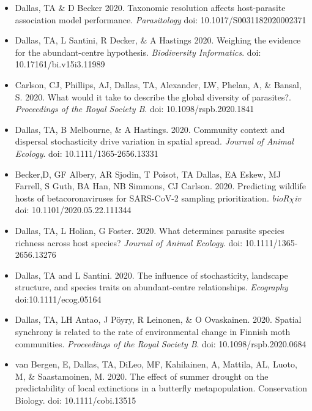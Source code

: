 \documentclass[]{CV}
\begin{document}
\begin{itemize}

\item {\mefont Dallas, TA} \& D Becker 2020. Taxonomic resolution affects host-parasite association model performance. \textit{Parasitology} doi: 10.1017/S0031182020002371

\item {\mefont Dallas, TA}, L Santini, R Decker, \& A Hastings 2020. Weighing the evidence for the abundant-centre hypothesis. \textit{Biodiversity Informatics}. doi: 10.17161/bi.v15i3.11989 

\item Carlson, CJ, Phillips, AJ, {\mefont Dallas, TA}, Alexander, LW, Phelan, A, \& Bansal, S. 2020. What would it take to describe the global diversity of parasites?. \textit{Proceedings of the Royal Society B}. doi: 10.1098/rspb.2020.1841

\item {\mefont Dallas, TA}, B Melbourne, \& A Hastings. 2020. Community context and dispersal stochasticity drive variation in spatial spread. \textit{Journal of Animal Ecology}. doi: 10.1111/1365-2656.13331

\item Becker,D, GF Albery, AR Sjodin, T Poisot, {\mefont TA Dallas}, EA Eskew, MJ Farrell, S Guth, BA Han, NB Simmons, CJ Carlson. 2020. Predicting wildlife hosts of betacoronaviruses for SARS-CoV-2 sampling prioritization. \textit{bioR$\chi$iv} doi: 10.1101/2020.05.22.111344 

\item {\mefont Dallas, TA}, L Holian, G Foster. 2020. What determines parasite species richness across host species? \textit{Journal of Animal Ecology}. doi: 10.1111/1365-2656.13276

\item {\mefont Dallas, TA} and L Santini. 2020. The influence of stochasticity, landscape structure, and species traits on abundant-centre relationships. \textit{Ecography} doi:10.1111/ecog.05164

\item {\mefont Dallas, TA}, LH Antao, J Pöyry, R Leinonen, \& O Ovaskainen. 2020. Spatial synchrony is related to the rate of environmental change in Finnish moth communities. \textit{Proceedings of the Royal Society B}. doi: 10.1098/rspb.2020.0684

\item van Bergen, E, {\mefont Dallas, TA}, DiLeo, MF, Kahilainen, A, Mattila, AL, Luoto, M, \& Saastamoinen, M. 2020. The effect of summer drought on the predictability of local extinctions in a butterfly metapopulation. Conservation Biology. doi: 10.1111/cobi.13515


\end{itemize}
\end{document}
